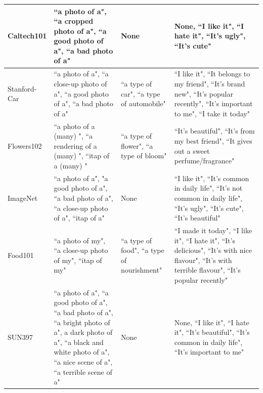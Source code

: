 \begin{table}
{\begin{tabular}{m{1.5cm}|m{4cm}|m{2cm}|m{4cm}}
    	Caltech101   & ``a photo  of a", ``a cropped photo  of a", ``a good photo  of a", ``a bad photo  of a"                                                                                  & None                                                             & None, ``I like it", ``I hate it", ``It's ugly", ``It's cute"                                                                                           \\ \midrule
    	Stanford-Car & ``a photo  of a", ``a close-up photo  of a", ``a good photo  of a", ``a bad photo  of a"                                                                                 & ``a type of car", ``a type of automobile"                        & ``I like it", ``It belongs to my friend", ``It's brand new", ``It's popular recently", ``It's important to me", ``I take it today"                    \\ \midrule
    	Flowers102   & ``a photo of a (many) ", ``a rendering of a (many) ", ``itap of a (many) "                                                                                                                & ``a type of flower", ``a type of bloom"                          & ``It's beautiful", ``It's from my best friend", ``It gives out a sweet perfume/fragrance"                                                             \\ \midrule
    	ImageNet       & ``a photo of a", "a good photo of a", ``a bad photo of a", ``a close-up photo of a", ``itap of a"                                                                         & None                                                             & ``I like it", ``It's common in daily life", ``It's not common in daily life", ``It's ugly", ``It's cute", ``It's beautiful"                           \\ \midrule
    	Food101      & ``a photo of my", ``a close-up photo  of my", ``itap  of my"                                                                                                         & ``a type of food", ``a type of nourishment"                      & ``I made it today", ``I like it", ``I hate it", ``It's delicious", ``It's with nice flavour", ``It's with terrible flavour", ``It's popular recently" \\ \midrule
    	SUN397       & ``a photo  of a", ``a good photo  of a", ``a bad photo  of a", ``a bright photo  of a", a dark photo  of a", ``a black and white photo  of a", ``a nice scene  of a", ``a terrible scene  of a" & None                                                             & None, ``I like it", ``I hate it", ``It's beautiful", ``It's common in daily life", ``It's important to me"                                             \\ \midrule

\end{tabular}}
\end{table}
